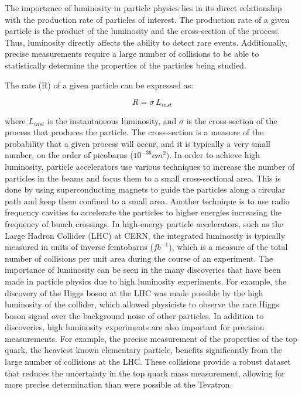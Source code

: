 The importance of luminosity in particle physics lies in its direct relationship with the production rate of particles of interest. The production rate of a given particle is the product of the luminosity and the cross-section of the process. Thus, luminosity directly affects the ability to detect rare events.
Additionally, precise measurements require a large number of collisions to be able to statistically determine the properties of the particles being studied.

The rate (R) of a given particle can be expressed as:

\begin{equation}
R = \sigma \: L_{inst} 
\end{equation}

where %
$L_{inst}$ is the instantaneous luminosity, and $\sigma$ is the cross-section of the process that produces the particle. The cross-section is a measure of the probability that a given process will occur, and it is typically a very small number, on the order of picobarns ($10^{-36} cm^2$).
In order to achieve high luminosity, particle accelerators use various techniques to increase the number of particles in the beams and focus them to a small cross-sectional area. This is done by using superconducting magnets to guide the particles along a circular path and keep them confined to a small area. Another technique is to use radio frequency cavities to accelerate the particles to higher energies increasing the frequency of bunch crossings. In high-energy particle accelerators, such as the Large Hadron Collider (LHC) at CERN, the integrated luminosity is typically measured in units of inverse femtobarns ($fb^{-1}$), which is a measure of the total number of collisions per unit area during the course of an experiment.
The importance of luminosity can be seen in the many discoveries that have been made in particle physics due to high luminosity experiments. For example, the discovery of the Higgs boson at the LHC was made possible by the high luminosity of the collider, which allowed physicists to observe the rare Higgs boson signal over the background noise of other particles. In addition to discoveries, high luminosity experiments are also important for precision measurements. For example, the precise measurement of the properties of the top quark, the heaviest known elementary particle, benefits significantly from the large number of collisions at the LHC. These collisions provide a robust dataset that reduces the uncertainty in the top quark mass measurement, allowing for more precise determination than were possible at the Tevatron.

